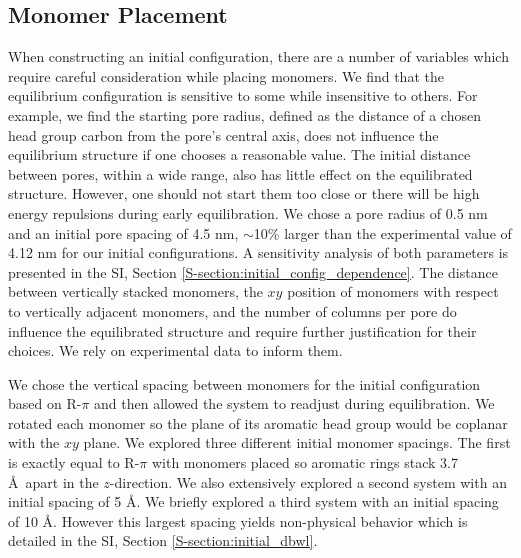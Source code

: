 \documentclass[journal=jpcbfk,manuscript=article]{achemso}
\begin{document}
  \subsection{Monomer Placement}\label{method:monomer_placement}

  When constructing an initial configuration, there are a number of variables
  which require careful consideration while placing monomers. We find that the
  equilibrium configuration is sensitive to some while insensitive to others. For
  example, we find the starting pore radius, defined as the distance of a chosen
  head group carbon from the pore's central axis, does not influence the
  equilibrium structure if one chooses a reasonable value. The initial distance
  between pores, within a wide range, also has little effect on the equilibrated
  structure. However, one should not start them too close or there will be high
  energy repulsions during early equilibration. We chose a pore radius of 0.5 nm
  and an initial pore spacing of 4.5 nm, $\sim$10\% larger than the experimental
  value of 4.12 nm for our initial configurations. A sensitivity analysis of both
  parameters is presented in the SI, Section
  \ref{S-section:initial_config_dependence}. The distance between vertically
  stacked monomers, the $xy$ position of monomers with respect to vertically
  adjacent monomers, and the number of columns per pore do influence the
  equilibrated structure and require further justification for their choices. We
  rely on experimental data to inform them. 

  We chose the vertical spacing between monomers for the initial configuration
  based on R-$\pi$ and then allowed the system to readjust during equilibration.
  We rotated each monomer so the plane of its aromatic head group would be
  coplanar with the $xy$ plane. We explored three different initial monomer
  spacings. The first is exactly equal to R-$\pi$ with monomers placed so
  aromatic rings stack 3.7 \AA~apart in the $z$-direction. We also extensively
  explored a second system with an initial spacing of 5 \AA. We briefly explored
  a third system with an initial spacing of 10 \AA. However this largest spacing
  yields non-physical behavior which is detailed in the SI, Section
  \ref{S-section:initial_dbwl}. 
\end{document}
